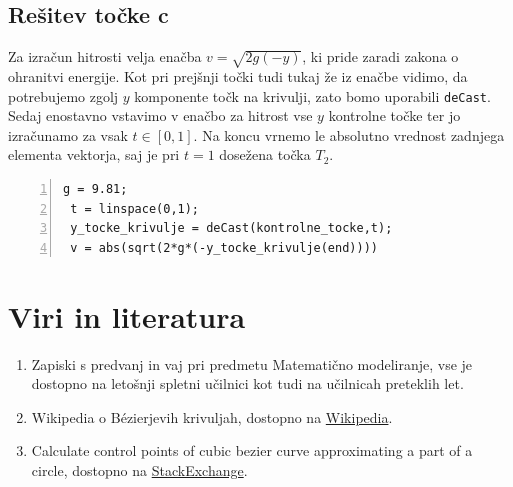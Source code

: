 \documentclass[a4paper,12pt]{article}
\begin{document}
	\subsection{Rešitev točke c}
	
	Za izračun hitrosti velja enačba $v = \sqrt{2g(-y)}$, ki pride zaradi zakona o ohranitvi energije. 
	Kot pri prejšnji točki tudi tukaj že iz enačbe vidimo, da potrebujemo zgolj $y$ komponente točk na krivulji, zato bomo
	uporabili \lstinline[style=Matlab-editor]!deCast!. Sedaj enostavno vstavimo v enačbo za hitrost vse $y$ kontrolne točke ter
	jo izračunamo za vsak $t \in [0,1]$. Na koncu vrnemo le absolutno vrednost zadnjega elementa vektorja, saj je pri $t = 1$ dosežena točka $T_2$.

	\begin{lstlisting}[style=Matlab-editor,	numbers=left,]
 g = 9.81;
 t = linspace(0,1);
 y_tocke_krivulje = deCast(kontrolne_tocke,t);
 v = abs(sqrt(2*g*(-y_tocke_krivulje(end))))
	\end{lstlisting}
	

	\section{Viri in literatura}
	
	\begin{enumerate}[label=\textbullet]
		\item Zapiski s predvanj in vaj pri predmetu Matematično modeliranje, vse je dostopno na letošnji spletni učilnici kot tudi na učilnicah preteklih let.
		\item Wikipedia o B\'{e}zierjevih krivuljah, dostopno na \href{https://sl.wikipedia.org/wiki/Bézierova_krivulja}{Wikipedia}.
		\item Calculate control points of cubic bezier curve approximating a part of a circle, dostopno na \href{https://math.stackexchange.com/questions/873224/calculate-control-points-of-cubic-bezier-curve-approximating-a-part-of-a-circle}{StackExchange}.
	\end{enumerate}
	
\end{document}
